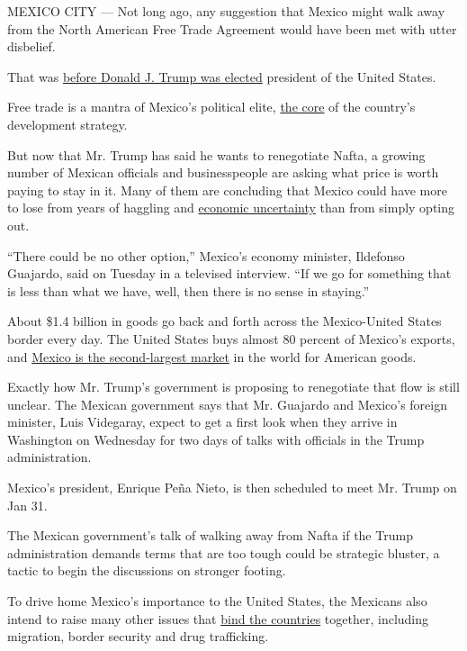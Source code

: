 MEXICO CITY --- Not long ago, any suggestion that Mexico might walk away
from the North American Free Trade Agreement would have been met with
utter disbelief.

That was
\href{https://www.nytimes.com/2016/11/10/world/americas/mexico-donald-trump-peso.html}{before
Donald J. Trump was elected} president of the United States.

Free trade is a mantra of Mexico's political elite,
\href{https://www.nytimes.com/2017/01/04/world/americas/mexico-donald-trump-nafta.html}{the
core} of the country's development strategy.

But now that Mr. Trump has said he wants to renegotiate Nafta, a growing
number of Mexican officials and businesspeople are asking what price is
worth paying to stay in it. Many of them are concluding that Mexico
could have more to lose from years of haggling and
\href{https://www.nytimes.com/2016/11/27/world/americas/mexico-oil-pemex-donald-trump.html}{economic
uncertainty} than from simply opting out.

``There could be no other option,'' Mexico's economy minister, Ildefonso
Guajardo, said on Tuesday in a televised interview. ``If we go for
something that is less than what we have, well, then there is no sense
in staying.''

About \$1.4 billion in goods go back and forth across the Mexico-United
States border every day. The United States buys almost 80 percent of
Mexico's exports, and
\href{https://www.census.gov/foreign-trade/statistics/highlights/top/top1611yr.html}{Mexico
is the second-largest market} in the world for American goods.

Exactly how Mr. Trump's government is proposing to renegotiate that flow
is still unclear. The Mexican government says that Mr. Guajardo and
Mexico's foreign minister, Luis Videgaray, expect to get a first look
when they arrive in Washington on Wednesday for two days of talks with
officials in the Trump administration.

Mexico's president, Enrique Peña Nieto, is then scheduled to meet Mr.
Trump on Jan 31.

The Mexican government's talk of walking away from Nafta if the Trump
administration demands terms that are too tough could be strategic
bluster, a tactic to begin the discussions on stronger footing.

To drive home Mexico's importance to the United States, the Mexicans
also intend to raise many other issues that
\href{https://www.nytimes.com/2017/01/23/world/americas/trump-pena-nieto-mexico-meeting.html}{bind
the countries} together, including migration, border security and drug
trafficking.

